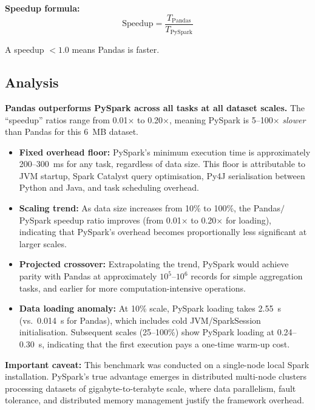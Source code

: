 \documentclass[12pt,a4paper]{article}
\begin{document}
\textbf{Speedup formula:}
\[
\text{Speedup} = \frac{T_{\text{Pandas}}}{T_{\text{PySpark}}}
\]

A speedup $< 1.0$ means Pandas is faster.

\subsection{Analysis}

\begin{findingbox}
\textbf{Pandas outperforms PySpark across all tasks at all dataset scales.} The ``speedup'' ratios range from 0.01$\times$ to 0.20$\times$, meaning PySpark is 5--100$\times$ \emph{slower} than Pandas for this 6~MB dataset.
\end{findingbox}

\begin{itemize}
    \item \textbf{Fixed overhead floor:} PySpark's minimum execution time is approximately 200--300~ms for any task, regardless of data size. This floor is attributable to JVM startup, Spark Catalyst query optimisation, Py4J serialisation between Python and Java, and task scheduling overhead.
    \item \textbf{Scaling trend:} As data size increases from 10\% to 100\%, the Pandas$/$PySpark speedup ratio improves (from 0.01$\times$ to 0.20$\times$ for loading), indicating that PySpark's overhead becomes proportionally less significant at larger scales.
    \item \textbf{Projected crossover:} Extrapolating the trend, PySpark would achieve parity with Pandas at approximately $10^5$--$10^6$ records for simple aggregation tasks, and earlier for more computation-intensive operations.
    \item \textbf{Data loading anomaly:} At 10\% scale, PySpark loading takes 2.55~s (vs.\ 0.014~s for Pandas), which includes cold JVM/SparkSession initialisation. Subsequent scales (25--100\%) show PySpark loading at 0.24--0.30~s, indicating that the first execution pays a one-time warm-up cost.
\end{itemize}

\textbf{Important caveat:} This benchmark was conducted on a single-node local Spark installation. PySpark's true advantage emerges in distributed multi-node clusters processing datasets of gigabyte-to-terabyte scale, where data parallelism, fault tolerance, and distributed memory management justify the framework overhead.
\end{document}
